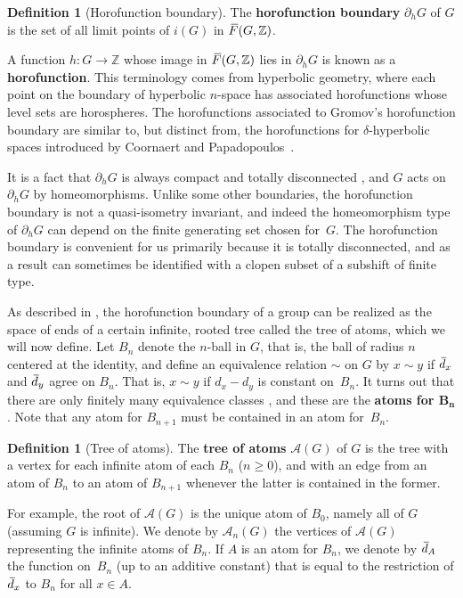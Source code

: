 \documentclass[11pt,letterpaper]{amsart}
\theoremstyle{definition}
\newtheorem{definition}[theorem]{Definition}
\newcommand{\newword}[1]{\textbf{#1}}
\newcommand{\Z}{\mathbb{Z}}
\newcommand{\A}{\mathcal{A}}
\newcommand{\oF}{\mkern 3.75mu\overline{\mkern-3.75mu F}}
\newcommand{\od}{\mkern 3mu\overline{\mkern-3mu d\mkern 1.5mu}\mkern-1.5mu}
\begin{document}
\begin{definition}[Horofunction boundary]
The \newword{horofunction boundary} $\partial_h G$ of $G$ is the set of all limit points of $i(G)$ in $\oF(G,\Z)$.
\end{definition}

A function $h\colon G\to \Z$ whose image in $\oF(G,\Z)$ lies in $\partial_h G$ is known as a \newword{horofunction}.  This terminology comes from hyperbolic geometry, where each point on the boundary of hyperbolic $n$-space has associated horofunctions whose level sets are horospheres.  The horofunctions associated to Gromov's horofunction boundary are similar to, but distinct from, the horofunctions for $\delta$-hyperbolic spaces introduced by Coornaert and Papadopoulos~\cite{Coornaert-Papadopoulos-1}.

It is a fact that $\partial_h G$ is always compact and totally disconnected \cite[Proposition~1.28]{BelkBleakMatucci}, and $G$ acts on $\partial_h G$ by homeomorphisms.  Unlike some other boundaries, the horofunction boundary is not a quasi-isometry invariant, and indeed the homeomorphism type of $\partial_h G$ can depend on the finite generating set chosen for~$G$.  The horofunction boundary is convenient for us primarily because it is totally disconnected, and as a result can sometimes be identified with a clopen subset of a subshift of finite type.

As described in \cite{BelkBleakMatucci}, the horofunction boundary of a group can be realized as the space of ends of a certain infinite, rooted tree called the tree of atoms, which we will now define.  Let $B_n$ denote the $n$-ball in $G$, that is, the ball of radius $n$ centered at the identity, and define an equivalence relation $\sim$ on $G$ by $x\sim y$ if $\od_x$ and $\od_y$ agree on $B_n$.  That is, $x\sim y$ if $d_x-d_y$ is constant on~$B_n$.  It turns out that there are only finitely many equivalence classes \cite[Proposition~3.3]{BelkBleakMatucci}, and these are the \newword{atoms for $\boldsymbol{B_n}$}.  Note that any atom for $B_{n+1}$ must be contained in an atom for~$B_n$.

\begin{definition}[Tree of atoms]
The \newword{tree of atoms} $\A(G)$ of $G$ is the tree with a vertex for each infinite atom of each $B_n$ ($n\ge 0$), and with an edge from an atom of $B_n$ to an atom of $B_{n+1}$ whenever the latter is contained in the former.
\end{definition}

For example, the root of $\A(G)$ is the unique atom of $B_0$, namely all of $G$ (assuming $G$ is infinite).  We denote by $\A_n(G)$ the vertices of $\A(G)$ representing the infinite atoms of $B_n$.  If $A$ is an atom for $B_n$, we denote by $\od_A$ the function on~$B_n$ (up to an additive constant) that is equal to the restriction of $\od_x$ to $B_n$ for all $x\in A$.
\end{document}
